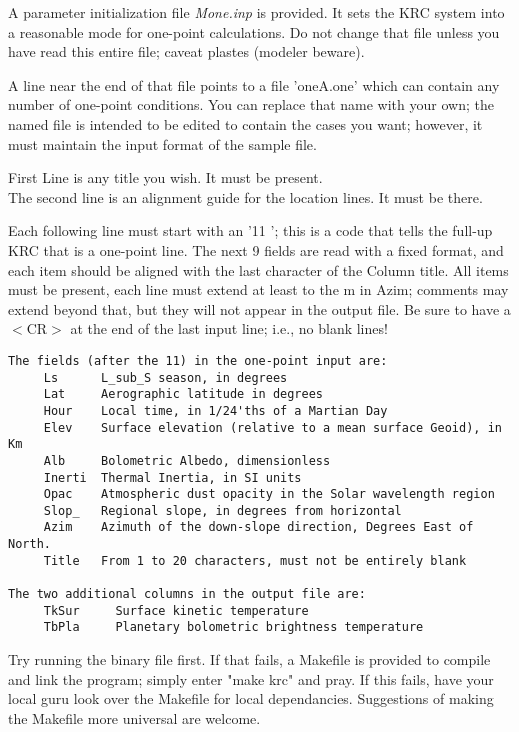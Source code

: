 \documentclass{article}
\newcommand{\nf}{\textit}  %
\begin{document}
A parameter initialization file   \nf{Mone.inp}  is provided. It sets the KRC 
system into a reasonable mode for one-point calculations. Do not change that 
file unless you have read this entire file; caveat plastes (modeler beware).

A line near the end of that file points to a file 'oneA.one' which can contain
any number of one-point conditions. You can replace that name with your own; the
named file is intended to be edited to contain the cases you want; however, it
must maintain the input format of the sample file.

First Line is any title you wish. It must be present. \\
The second line is an alignment guide for the location lines. It must be there.

Each following line must start with an '11 '; this is a code that tells the
full-up KRC that is a one-point line. The next 9 fields are read with a fixed
format, and each item should be aligned with the last character of the Column
title. All items must be present, each line must extend at least to the m in
Azim; comments may extend beyond that, but they will not appear in the output
file. Be sure to have a $<$CR$>$ at the end of the last input line; i.e., no
blank lines!

\vspace{-3.mm} 
\begin{verbatim}
The fields (after the 11) in the one-point input are:
     Ls      L_sub_S season, in degrees
     Lat     Aerographic latitude in degrees
     Hour    Local time, in 1/24'ths of a Martian Day
     Elev    Surface elevation (relative to a mean surface Geoid), in Km
     Alb     Bolometric Albedo, dimensionless
     Inerti  Thermal Inertia, in SI units
     Opac    Atmospheric dust opacity in the Solar wavelength region
     Slop_   Regional slope, in degrees from horizontal
     Azim    Azimuth of the down-slope direction, Degrees East of North.
     Title   From 1 to 20 characters, must not be entirely blank

The two additional columns in the output file are:
     TkSur     Surface kinetic temperature
     TbPla     Planetary bolometric brightness temperature
\end{verbatim}

Try running the binary file first. If that fails, a Makefile is provided to
compile and link the program; simply enter "make krc" and pray. If this fails,
have your local guru look over the Makefile for local dependancies. Suggestions
of making the Makefile more universal are welcome.
\end{document}
